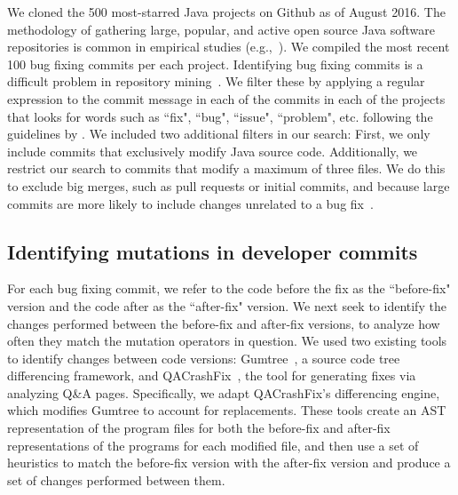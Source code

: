 \documentclass[conference]{IEEEtran}
\begin{document}
We cloned the 500 most-starred Java projects on Github 
as of August 2016. The methodology of 
gathering large,
popular, and active open source Java software repositories is common in
empirical studies (e.g.,~\cite{Ray14}). 
%
We compiled the most recent 100 bug fixing commits per each project. Identifying
bug fixing commits is a difficult
problem in repository mining~\cite{Bird09}. We filter these by applying a
regular expression to the commit message in each of the commits in each of the
projects that looks for words such as ``fix", ``bug", ``issue", ``problem",
etc. following the guidelines by \cite{schroter06,Cubranic05,Fischer03}. 
%
We included two additional filters in our search: First, we only include commits
that exclusively 
modify Java source code.  Additionally, we restrict our search to commits 
that modify a maximum of three files. We do this to exclude
big merges, such as pull requests or initial commits, and because
large commits are more likely to include changes unrelated to a bug fix~\cite{Dias15,Herzig13,Matsuda15,Kawrykow11}.

\subsection{Identifying mutations in developer commits}
\label{sec:mining}

For each bug fixing commit, we refer to the code before the fix as the
``before-fix" version and the code after as the ``after-fix" version.
We next seek to identify the changes performed between the before-fix and
after-fix versions, to analyze how often they match the mutation operators in
question. 
%
We used two existing tools to identify changes 
between code versions: Gumtree~\cite{falleri14}, a source code tree
differencing framework, and QACrashFix~\cite{gao15}, the tool for generating
fixes via analyzing Q\&A pages.  Specifically, we adapt QACrashFix's
differencing engine, which modifies Gumtree to account for replacements.
These tools create an AST representation of the program files for both the 
before-fix and after-fix representations of the programs for each modified file,
and then use a set of heuristics to match the before-fix version 
with the after-fix version and produce a set of 
changes performed between them. 
\end{document}
